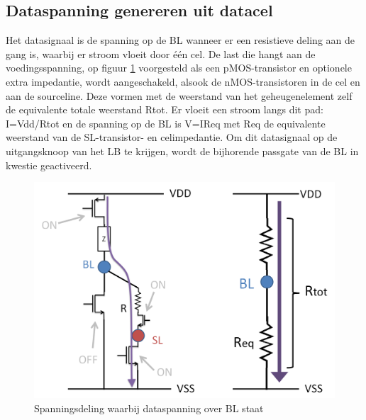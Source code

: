 \subsection{Dataspanning genereren uit datacel}
\label{dataread}
Het datasignaal is de spanning op de BL wanneer er een resistieve deling aan de gang is, waarbij er stroom vloeit door één cel. De last die hangt aan de voedingsspanning, op figuur \ref{fig:dataread} voorgesteld als een pMOS-transistor en optionele extra impedantie, wordt aangeschakeld, alsook de nMOS-transistoren in de cel en aan de sourceline. Deze vormen met de weerstand van het geheugenelement zelf de equivalente totale weerstand Rtot. Er vloeit een stroom langs dit pad: I=Vdd/Rtot en de spanning op de BL is V=IReq met Req de equivalente weerstand van de SL-transistor- en celimpedantie. Om dit datasignaal op de uitgangsknoop van het LB te krijgen, wordt de bijhorende passgate van de BL in kwestie geactiveerd.

\begin{figure}
  \centering
  \includegraphics[scale=0.3]{../fig/hfdstk-architecture-datasignal.png}
  \caption{Spanningsdeling waarbij dataspanning over BL staat}
  \label{fig:dataread}
\end{figure}

